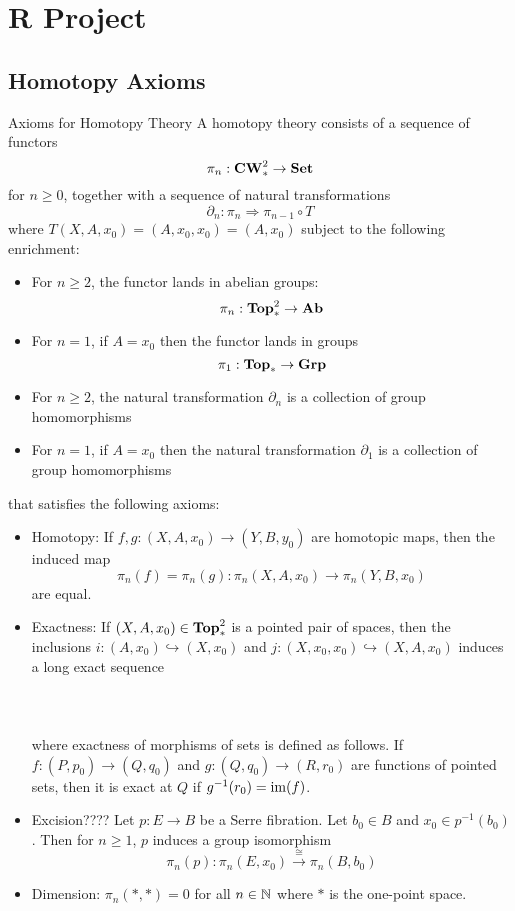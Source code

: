 \documentclass[a4paper]{article}
\begin{document}
\pagebreak
\section{R Project}
\subsection{Homotopy Axioms}
\begin{defn}{Axioms for Homotopy Theory}{} A homotopy theory consists of a sequence of functors $$\pi_n:\bold{CW}_\ast^2\to\bold{Set}$$ for $n\geq 0$, together with a sequence of natural transformations $$\partial_n:\pi_n\Rightarrow\pi_{n-1}\circ T$$ where $T(X,A,x_0)=(A,x_0,x_0)=(A,x_0)$ subject to the following enrichment: 
\begin{itemize}
\item For $n\geq 2$, the functor lands in abelian groups: $$\pi_n:\bold{Top}_\ast^2\to\bold{Ab}$$
\item For $n=1$, if $A=x_0$ then the functor lands in groups $$\pi_1:\bold{Top}_\ast\to\bold{Grp}$$
\item For $n\geq 2$, the natural transformation $\partial_n$ is a collection of group homomorphisms
\item For $n=1$, if $A=x_0$ then the natural transformation $\partial_1$ is a collection of group homomorphisms
\end{itemize}
that satisfies the following axioms: 
\begin{itemize}
\item Homotopy: If $f,g:(X,A,x_0)\to(Y,B,y_0)$ are homotopic maps, then the induced map $$\pi_n(f)=\pi_n(g):\pi_n(X,A,x_0)\to\pi_n(Y,B,x_0)$$ are equal. 
\item Exactness: If $(X,A,x_0)\in\bold{Top}_\ast^2$ is a pointed pair of spaces, then the inclusions $i:(A,x_0)\hookrightarrow(X,x_0)$ and $j:(X,x_0,x_0)\hookrightarrow(X,A,x_0)$ induces a long exact sequence \\~\\
\\~\\
where exactness of morphisms of sets is defined as follows. If $f:(P,p_0)\to(Q,q_0)$ and $g:(Q,q_0)\to(R,r_0)$ are functions of pointed sets, then it is exact at $Q$ if $g^{-1}(r_0)=\operatorname{im}(f)$. 
\item Excision???? Let $p:E\to B$ be a Serre fibration. Let $b_0\in B$ and $x_0\in p^{-1}(b_0)$. Then for $n\geq 1$, $p$ induces a group isomorphism $$\pi_n(p):\pi_n(E,x_0)\overset{\cong}{\longrightarrow}\pi_n(B,b_0)$$
\item Dimension: $\pi_n(\ast,\ast)=0$ for all $n\in\mathbb{N}$ where $\ast$ is the one-point space. 
\end{itemize}
\end{defn}
\end{document}
